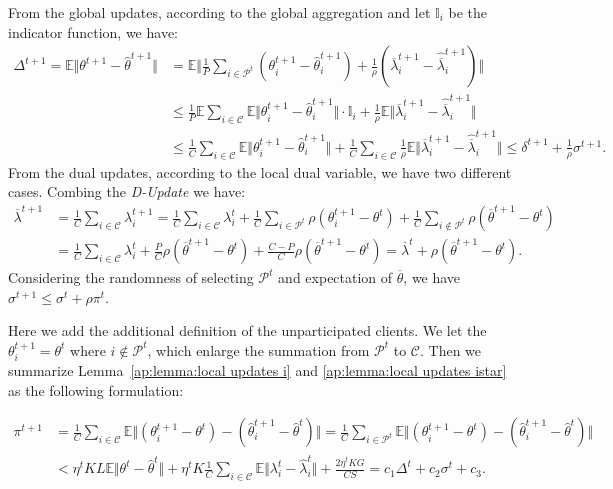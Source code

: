 From the global updates, according to the global aggregation and let $\mathbb{I}_i$ be the indicator function, we have:
\begin{align*}
    \Delta^{t+1} = \mathbb{E}\Vert \theta^{t+1} - \hat{\theta}^{t+1}\Vert 
    &= \mathbb{E}\Vert \frac{1}{P}\sum_{i\in\mathcal{P}^t}\left(\theta_i^{t+1} - \hat{\theta}_i^{t+1}\right) + \frac{1}{\rho}\left(\overline{\lambda}_i^{t+1} - \hat{\overline{\lambda}}_i^{t+1}\right)\Vert\\
    &\leq \frac{1}{P}\mathbb{E}\sum_{i\in\mathcal{C}}\mathbb{E}\Vert \theta_i^{t+1} - \hat{\theta}_i^{t+1}\Vert\cdot\mathbb{I}_i + \frac{1}{\rho}\mathbb{E}\Vert \overline{\lambda}_i^{t+1} - \hat{\overline{\lambda}}_i^{t+1}\Vert\\
    &\leq \frac{1}{C}\sum_{i\in\mathcal{C}}\mathbb{E}\Vert \theta_i^{t+1} - \hat{\theta}_i^{t+1}\Vert + \frac{1}{C}\sum_{i\in\mathcal{C}}\frac{1}{\rho}\mathbb{E}\Vert \overline{\lambda}_i^{t+1} - \hat{\overline{\lambda}}_i^{t+1}\Vert \leq \delta^{t+1} + \frac{1}{\rho}\sigma^{t+1}.
\end{align*}
From the dual updates, according to the local dual variable, we have two different cases. Combing the \textit{D-Update} we have:
\begin{align*}
    \overline{\lambda}^{t+1} 
    &= \frac{1}{C}\sum_{i\in\mathcal{C}}\lambda_i^{t+1} = \frac{1}{C}\sum_{i\in\mathcal{C}}\lambda_i^t + \frac{1}{C}\sum_{i\in\mathcal{P}^t}\rho(\theta_i^{t+1} - \theta^t) + \frac{1}{C}\sum_{i\notin\mathcal{P}^t}\rho(\overline{\theta}^{t+1} - \theta^t)\\
    &= \frac{1}{C}\sum_{i\in\mathcal{C}}\lambda_i^t + \frac{P}{C}\rho(\overline{\theta}^{t+1} - \theta^t) + \frac{C-P}{C}\rho(\overline{\theta}^{t+1} - \theta^t) = \overline{\lambda}^t + \rho(\overline{\theta}^{t+1} - \theta^t).
\end{align*}
Considering the randomness of selecting $\mathcal{P}^t$ and expectation of $\overline{\theta}$, we have $\sigma^{t+1} \leq \sigma^{t} + \rho\pi^t$.

Here we add the additional definition of the unparticipated clients. We let the $\theta_i^{t+1} = \theta^t$ where $i\notin\mathcal{P}^t$, which enlarge the summation from $\mathcal{P}^t$ to $\mathcal{C}$. Then we summarize Lemma~\ref{ap:lemma:local updates i} and \ref{ap:lemma:local updates istar} as the following formulation:

\begin{align*}
    \pi^{t+1} 
    &= \frac{1}{C}\sum_{i\in\mathcal{C}}\mathbb{E}\Vert\left(\theta_{i}^{t+1} - \theta^t \right) - \left(\hat{\theta}_{i}^{t+1} - \hat{\theta}^t \right)\Vert = \frac{1}{C}\sum_{i\in\mathcal{P}^t}\mathbb{E}\Vert\left(\theta_{i}^{t+1} - \theta^t \right) - \left(\hat{\theta}_{i}^{t+1} - \hat{\theta}^t \right)\Vert\\
    &< \eta^t KL\mathbb{E}\Vert \theta^t - \hat{\theta}^t\Vert + \eta^t K\frac{1}{C}\sum_{i\in\mathcal{C}}\mathbb{E}\Vert\lambda_i^t - \hat{\lambda}_i^t\Vert + \frac{2\eta^t KG}{CS} = c_1\Delta^t + c_2\sigma^t + c_3.
\end{align*}

